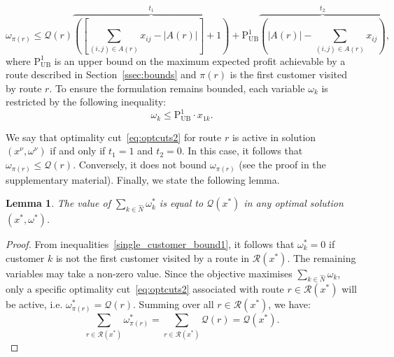 \documentclass[11pt]{article}
\newtheorem{lemma}[theorem]{Lemma}
\theoremstyle{definition}
\begin{document}
\begin{equation}
  \label{eq:optcuts2}
  \omega_{\pi(r)} \leq \mathcal{Q}(r)\overbrace{\left(\left [\sum_{(i,j) \in A(r)} x_{ij} - |A(r)| \right ] + 1 \right)}^{t_1} + \text{P}^1_{\text{UB}} \overbrace{\left( |A(r)| - \sum_{(i,j) \in A(r)} x_{ij} \right)}^{t_2},
\end{equation}
%
where $\text{P}^1_{\text{UB}}$ is an upper bound on the maximum expected profit achievable by a route described in Section~\ref{ssec:bounds} and $\pi(r)$ is the first customer visited by route $r$. To ensure the formulation remains bounded, each variable $\omega_k$ is restricted by the following inequality:
\begin{equation}
\omega_k \leq \text{P}^1_{\text{UB}} \cdot x_{1k}. \label{single_customer_bound1}
\end{equation}

We say that optimality cut~\eqref{eq:optcuts2} for route $r$ is active in solution $(x^{\nu}, \omega^{\nu})$ if and only if $t_1 = 1$ and $t_2 = 0$. In this case, it follows that $\omega_{\pi(r)} \leq \mathcal{Q}(r)$.
Conversely, it does not bound $\omega_{\pi(r)}$ (see the proof in the supplementary material).
%
Finally, we state the following lemma.
%

\begin{lemma}
  The value of $\sum_{k \in \hat{N}} \omega_k^*$ is equal to $\mathcal{Q}(x^*)$ in any optimal solution $(x^*, \omega^*)$.
\end{lemma}
\begin{proof}
  From inequalities~\eqref{single_customer_bound1}, it follows that $\omega^*_k = 0$ if customer $k$ is not the first customer visited by a route in $\mathcal{R}(x^*)$. The remaining variables may take a non-zero value.
  Since the objective maximises $\sum_{k \in \hat{N}} \omega_k$, only a specific optimality cut~\eqref{eq:optcuts2} associated with route $r \in \mathcal{R}(x^*)$ will be active, i.e. $\omega_{\pi(r)}^* = \mathcal{Q}(r)$. Summing over all $r \in \mathcal{R}(x^*)$, we have:
  \begin{equation*}
  \sum_{r \in \mathcal{R}(x^*)} \omega^*_{\pi(r)} = \sum_{r \in \mathcal{R}(x^*)} \mathcal{Q}(r) = \mathcal{Q}(x^*).
  \end{equation*}
\end{proof}
\end{document}
